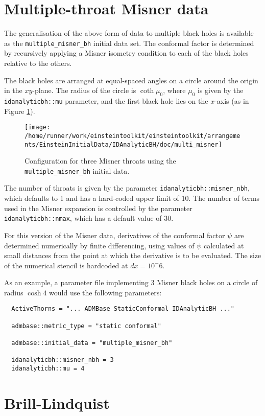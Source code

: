 \documentclass{article}
\begin{document}
\section{Multiple-throat Misner data}

The generalisation of the above form of data to multiple black holes
is available as the \texttt{multiple\_misner\_bh} initial data set. The
conformal factor is determined by recursively applying a Misner
isometry condition to each of the black holes relative to the others.

The black holes are arranged at equal-spaced angles on a circle around
the origin in the $xy$-plane. The radius of the circle is $\coth\mu_0$,
where $\mu_0$ is given by the \texttt{idanalyticbh::mu} parameter, and
the first black hole lies on the $x$-axis (as in Figure
\ref{fig:multi_misner}).
\begin{figure}
  \centering
  \label{fig:multi_misner}
  \texttt{[image: /home/runner/work/einsteintoolkit/einsteintoolkit/arrangements/EinsteinInitialData/IDAnalyticBH/doc/multi\_misner]}
  \caption{Configuration for three Misner throats using the
  \texttt{multiple\_misner\_bh} initial data.}
\end{figure}

The number of throats is given by the parameter
\texttt{idanalyticbh::misner\_nbh}, which defaults to 1 and has a
hard-coded upper limit of 10. The number of terms used in the Misner
expansion is controlled by the parameter
\texttt{idanalyticbh::nmax}, which has a default value of 30.

For this version of the Misner data, derivatives of the conformal
factor $\psi$ are determined numerically by finite differencing,
using values of $\psi$ calculated at small distances from the point at
which the derivative is to be evaluated. The size of the numerical
stencil is hardcoded at $dx=10^-6$.

As an example, a parameter file implementing 3 Misner black holes on a
circle of radius $\cosh 4$ would use the following parameters:
\begin{verbatim}
  ActiveThorns = "... ADMBase StaticConformal IDAnalyticBH ..."

  admbase::metric_type = "static conformal"

  admbase::initial_data = "multiple_misner_bh"

  idanalyticbh::misner_nbh = 3
  idanalyticbh::mu = 4
\end{verbatim}


\section{Brill-Lindquist}
\end{document}
